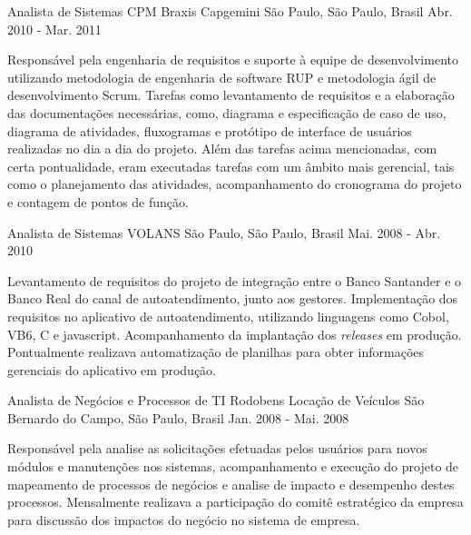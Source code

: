 \begin{cventries}
  \cventry
    {Analista de Sistemas} %
    {CPM Braxis Capgemini} %
    {São Paulo, São Paulo, Brasil} %
    {Abr. 2010 - Mar. 2011} %
    {
      \begin{cvitems} %
        \item{Responsável pela engenharia de requisitos e suporte à equipe de desenvolvimento utilizando metodologia de engenharia de software RUP e metodologia ágil de desenvolvimento Scrum. Tarefas como levantamento de requisitos e a elaboração das documentações necessárias, como, diagrama e especificação de caso de uso, diagrama de atividades, fluxogramas e protótipo de interface de usuários realizadas no dia a dia do projeto. Além das tarefas acima mencionadas, com certa pontualidade, eram executadas tarefas com um âmbito mais gerencial, tais como o planejamento das atividades, acompanhamento do cronograma do projeto e contagem de pontos de função.}
      \end{cvitems}
    }

  \cventry
    {Analista de Sistemas} %
    {VOLANS} %
    {São Paulo, São Paulo, Brasil} %
    {Mai. 2008 - Abr. 2010} %
    {
      \begin{cvitems} %
        \item{Levantamento de requisitos do projeto de integração entre o Banco Santander e o Banco Real do canal de autoatendimento, junto aos gestores. Implementação dos requisitos no aplicativo de autoatendimento, utilizando linguagens como Cobol, VB6, C e javascript. Acompanhamento da implantação dos \textit{releases} em produção. Pontualmente realizava automatização de planilhas para obter informações gerenciais do aplicativo em produção.}
      \end{cvitems}
    }

  \cventry
    {Analista de Negócios e Processos de TI} %
    {Rodobens Locação de Veículos} %
    {São Bernardo do Campo, São Paulo, Brasil} %
    {Jan. 2008 - Mai. 2008} %
    {
      \begin{cvitems} %
        \item{Responsável pela analise as solicitações efetuadas pelos usuários para novos módulos e manutenções nos sistemas, acompanhamento e execução do projeto de mapeamento de processos de negócios e analise de impacto e desempenho destes processos. Mensalmente realizava a participação do comitê estratégico da empresa para discussão dos impactos do negócio no sistema de empresa.}
      \end{cvitems}
    }


\end{cventries}
